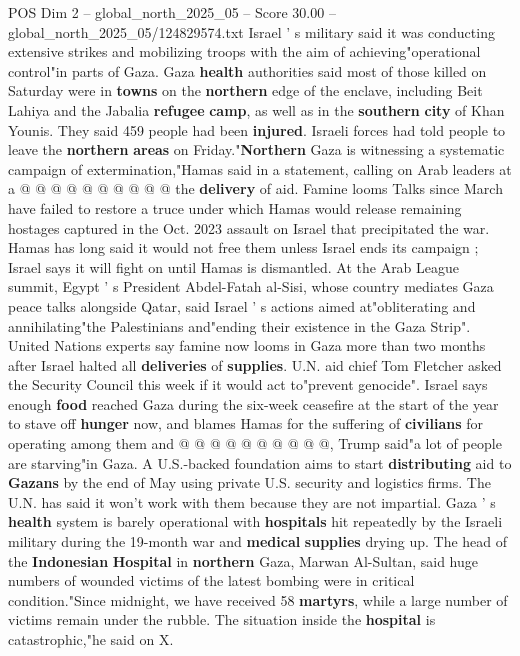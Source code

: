 \begin{textsample}{POS Dim 2 – global\_north\_2025\_05 – Score 30.00 – global\_north\_2025\_05/124829574.txt}
Israel ' s military said it was conducting extensive strikes and mobilizing troops with the aim of achieving"operational control"in parts of Gaza.
Gaza \textbf{health} authorities said most of those killed on Saturday were in \textbf{towns} on the \textbf{northern} edge of the enclave, including Beit Lahiya and the Jabalia \textbf{refugee} \textbf{camp}, as well as in the \textbf{southern} \textbf{city} of Khan Younis.
They said 459 people had been \textbf{injured}.
Israeli forces had told people to leave the \textbf{northern} \textbf{areas} on Friday."\textbf{Northern} Gaza is witnessing a systematic campaign of extermination,"Hamas said in a statement, calling on Arab leaders at a @ @ @ @ @ @ @ @ @ @ the \textbf{delivery} of aid.
Famine looms Talks since March have failed to restore a truce under which Hamas would release remaining hostages captured in the Oct. 2023 assault on Israel that precipitated the war.
Hamas has long said it would not free them unless Israel ends its campaign ; Israel says it will fight on until Hamas is dismantled.
At the Arab League summit, Egypt ' s President Abdel-Fatah al-Sisi, whose country mediates Gaza peace talks alongside Qatar, said Israel ' s actions aimed at"obliterating and annihilating"the Palestinians and"ending their existence in the Gaza Strip".
United Nations experts say famine now looms in Gaza more than two months after Israel halted all \textbf{deliveries} of \textbf{supplies}.
U.N. aid chief Tom Fletcher asked the Security Council this week if it would act to"prevent genocide".
Israel says enough \textbf{food} reached Gaza during the six-week ceasefire at the start of the year to stave off \textbf{hunger} now, and blames Hamas for the suffering of \textbf{civilians} for operating among them and @ @ @ @ @ @ @ @ @ @, Trump said"a lot of people are starving"in Gaza.
A U.S.-backed foundation aims to start \textbf{distributing} aid to \textbf{Gazans} by the end of May using private U.S. security and logistics firms.
The U.N. has said it won't work with them because they are not impartial.
Gaza ' s \textbf{health} system is barely operational with \textbf{hospitals} hit repeatedly by the Israeli military during the 19-month war and \textbf{medical} \textbf{supplies} drying up.
The head of the \textbf{Indonesian} \textbf{Hospital} in \textbf{northern} Gaza, Marwan Al-Sultan, said huge numbers of wounded victims of the latest bombing were in critical condition."Since midnight, we have received 58 \textbf{martyrs}, while a large number of victims remain under the rubble.
The situation inside the \textbf{hospital} is catastrophic,"he said on X.

\end{textsample}
